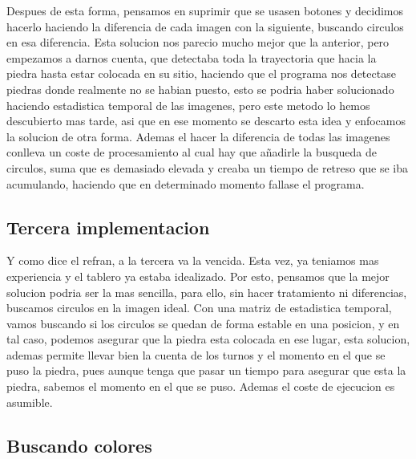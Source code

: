 \documentclass[12pt,a4paper]{report}
\begin{document}
Despues de esta forma, pensamos en suprimir que se usasen botones y decidimos hacerlo haciendo la diferencia de cada imagen con la siguiente, buscando circulos en esa diferencia. Esta solucion nos parecio mucho mejor que la anterior, pero empezamos a darnos cuenta, que detectaba toda la trayectoria que hacia la piedra hasta estar colocada en su sitio, haciendo que el programa nos detectase piedras donde realmente no se habian puesto, esto se podria haber solucionado haciendo estadistica temporal de las imagenes, pero este metodo lo hemos descubierto mas tarde, asi que en ese momento se descarto esta idea y enfocamos la solucion de otra forma. Ademas el hacer la diferencia de todas las imagenes conlleva un coste de procesamiento al cual hay que añadirle la busqueda de circulos, suma que es demasiado elevada y creaba un tiempo de retreso que se iba acumulando, haciendo que en determinado momento fallase el programa.

\subsection{Tercera implementacion}%

Y como dice el refran, a la tercera va la vencida. Esta vez, ya teniamos mas experiencia y el tablero ya estaba idealizado. Por esto, pensamos que la mejor solucion podria ser la mas sencilla, para ello, sin hacer tratamiento ni diferencias, buscamos circulos en la imagen ideal. Con una matriz de estadistica temporal, vamos buscando si los circulos se quedan de forma estable en una posicion, y en tal caso, podemos asegurar que la piedra esta colocada en ese lugar, esta solucion, ademas permite llevar bien la cuenta de los turnos y el momento en el que se puso la piedra, pues aunque tenga que pasar un tiempo para asegurar que esta la piedra, sabemos el momento en el que se puso. Ademas el coste de ejecucion es asumible.

\subsection{Buscando colores}%
\end{document}
